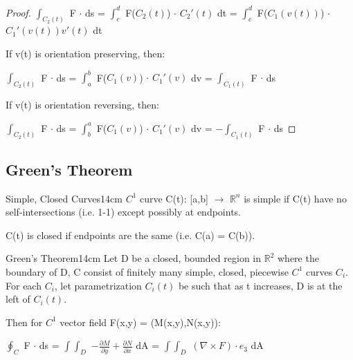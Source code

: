     \begin{proof}
        $\int_{C_2(t)}$ F $\cdot$ ds
        = $\int_c^d$ F($C_2(t)$) $\cdot$ $C_2'(t)$ dt
        = $\int_c^d$ F($C_1(v(t))$) $\cdot$ $C_1'(v(t)) v'(t)$ dt

        If v(t) is orientation preserving, then:

        \hspace{0.5cm}
        $\int_{C_2(t)}$ F $\cdot$ ds
        = $\int_a^b$ F($C_1(v)$) $\cdot$ $C_1'(v)$ dv
        = $\int_{C_1(t)}$ F $\cdot$ ds

        If v(t) is orientation reversing, then:

        \hspace{0.5cm}
        $\int_{C_2(t)}$ F $\cdot$ ds
        = $\int_b^a$ F($C_1(v)$) $\cdot$ $C_1'(v)$ dv
        = $-\int_{C_1(t)}$ F $\cdot$ ds
    \end{proof}

    \newpage



\subsection{ Green's Theorem }

    \begin{definition}{Simple, Closed Curves}{14cm}
        $C^1$ curve C(t): [a,b] $\rightarrow$ $\mathbb{R}^n$
        is {\color{lblue} simple} if C(t) have no self-intersections
        (i.e. 1-1) except possibly at endpoints.

        \vspace{0.3cm}

        C(t) is {\color{lblue} closed} if endpoints are the same
        (i.e. C(a) = C(b)).
    \end{definition}

    \vspace{0.5cm}



    \begin{wtheorem}{Green's Theorem}{14cm}
        Let D be a closed, bounded region in $\mathbb{R}^2$
        where the boundary of D, C consist of finitely many simple, closed,
        piecewise $C^1$ curves $C_i$.
        For each $C_i$, let parametrization $C_i(t)$ be such that
        as t increases, D is at the left of $C_i(t)$.

        Then for $C^1$ vector field F(x,y) = (M(x,y),N(x,y)):

        \hspace{0.5cm}
        $\oint_C$ F $\cdot$ ds
        = $\int \int_D$ $-\frac{\partial M}{\partial y}
                        + \frac{\partial N}{\partial x}$ dA
        = $\int \int_D$ $(\nabla \times F) \cdot e_3$ dA
    \end{wtheorem}

